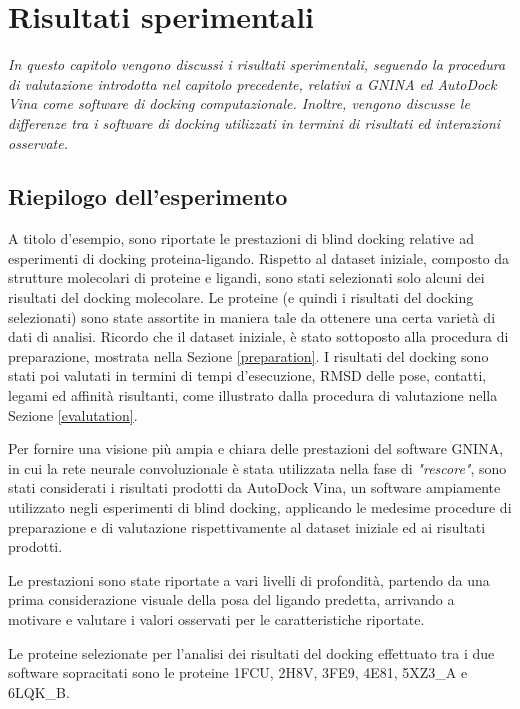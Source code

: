 \chapter{Risultati sperimentali}
\vskip 1cm

\textit{In questo capitolo vengono discussi i risultati sperimentali, seguendo la procedura di valutazione introdotta nel capitolo precedente, relativi a GNINA ed AutoDock Vina come software di docking computazionale. Inoltre, vengono discusse le differenze tra i software di docking utilizzati in termini di risultati ed interazioni osservate. }

\vskip 1cm
\section{Riepilogo dell'esperimento}
A titolo d'esempio, sono riportate le prestazioni di blind docking relative ad esperimenti di docking proteina-ligando. Rispetto al dataset iniziale, composto da strutture molecolari di proteine e ligandi, sono stati selezionati solo alcuni dei risultati del docking molecolare. 
Le proteine (e quindi i risultati del docking selezionati) sono state assortite in maniera tale da ottenere una certa varietà di dati di analisi. Ricordo che il dataset iniziale, è stato sottoposto alla procedura di preparazione, mostrata nella Sezione \ref{preparation}.
I risultati del docking sono stati poi valutati in termini di tempi d'esecuzione, RMSD delle pose, contatti, legami ed affinità risultanti, come illustrato dalla procedura di valutazione nella Sezione \ref{evalutation}.

Per fornire una visione più ampia e chiara delle prestazioni del software GNINA, in cui la rete neurale convoluzionale è stata utilizzata nella fase di \textit{"rescore"}, sono stati considerati i risultati prodotti da AutoDock Vina, un software ampiamente utilizzato negli esperimenti di blind docking, applicando le medesime procedure di preparazione e di valutazione rispettivamente al dataset iniziale ed ai risultati prodotti. 

Le prestazioni sono state riportate a vari livelli di profondità, partendo da una prima considerazione visuale della posa del ligando predetta, arrivando a motivare e valutare i valori osservati per le caratteristiche riportate. 

Le proteine selezionate per l'analisi dei risultati del docking effettuato tra i due software sopracitati sono le proteine 1FCU, 2H8V, 3FE9, 4E81, 5XZ3\_A e 6LQK\_B.

